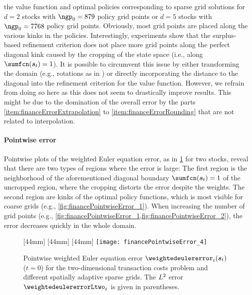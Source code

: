 the value function and optimal policies corresponding to
sparse grid solutions for
$d = 2$ stocks with $\ngp_0 = \num{879}$ policy grid points or
$d = 5$ stocks with $\ngp_0 = \num{7768}$ policy grid points.
Obviously, most grid points are placed along the various kinks in the
policies.
Interestingly, experiments show that the surplus-based refinement
criterion does not place more grid points along the perfect diagonal kink
caused by the cropping of the state space
(i.e., along $\sumfcn(\vstock_t) = 1$).
It is possible to circumvent this issue by either
transforming the domain (e.g., rotations as in \cite{Bohn18Optimally}) or
directly incorporating the distance to the diagonal into the
refinement criterion for the value function.
However, we refrain from doing so here as this does not seem to
drastically improve results.
This might be due to the domination of the overall error by
the parts \ref{item:financeErrorExtrapolation} to
\ref{item:financeErrorRounding} that are not related to interpolation.

\paragraph{Pointwise error}

Pointwise plots of the weighted Euler equation error,
as in \cref{fig:financePointwiseError} for two stocks,
reveal that there are two types of regions where the error is large:
The first region is the neighborhood of the aforementioned diagonal boundary
$\sumfcn(\vstock_t) = 1$ of the uncropped region,
where the cropping distorts the error despite the weights.
The second region are kinks of the optimal policy functions,
which is most visible for coarse grids
(e.g., \cref{fig:financePointwiseError_1}).
When increasing the number of grid points
(e.g., \cref{fig:financePointwiseError_1,fig:financePointwiseError_2}),
the error decreases quickly in the whole domain.

\begin{figure}
  [44mm]{%
  }%
  [44mm]{%
  }%
  [44mm]{%
  }%
  \hfill%
  \texttt{[image: financePointwiseError\_4]}%
  \caption[Pointwise weighted Euler equation error for different grids]{%
    Pointwise weighted Euler equation error $\weightedeulererror_t(\vstock_t)$
    ($t = 0$) for the two-dimensional transaction costs problem and
    different spatially adaptive sparse grids.
    The $L^2$ error $\weightedeulererrorLtwo_t$ is given in
    parentheses.%
  }%
  \label{fig:financePointwiseError}%
\end{figure}

